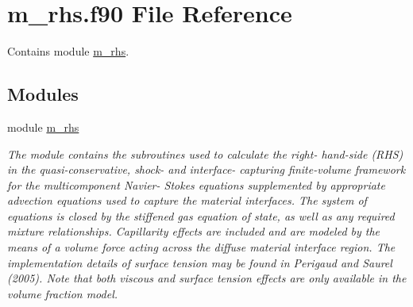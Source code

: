 \hypertarget{m__rhs_8f90}{}\section{m\+\_\+rhs.\+f90 File Reference}
\label{m__rhs_8f90}


Contains module \hyperlink{namespacem__rhs}{m\+\_\+rhs}.  


\subsection*{Modules}
\begin{DoxyCompactItemize}
\item 
module \hyperlink{namespacem__rhs}{m\+\_\+rhs}
\begin{DoxyCompactList}\small\item\em The module contains the subroutines used to calculate the right-\/ hand-\/side (R\+HS) in the quasi-\/conservative, shock-\/ and interface-\/ capturing finite-\/volume framework for the multicomponent Navier-\/ Stokes equations supplemented by appropriate advection equations used to capture the material interfaces. The system of equations is closed by the stiffened gas equation of state, as well as any required mixture relationships. Capillarity effects are included and are modeled by the means of a volume force acting across the diffuse material interface region. The implementation details of surface tension may be found in Perigaud and Saurel (2005). Note that both viscous and surface tension effects are only available in the volume fraction model. \end{DoxyCompactList}\end{DoxyCompactItemize}
